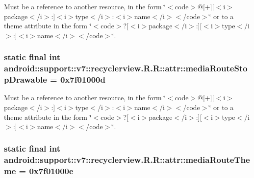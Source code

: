 Must be a reference to another resource, in the form \char`\"{}$<$code$>$@\mbox{[}+\mbox{]}\mbox{[}$<$i$>$package$<$/i$>$:\mbox{]}$<$i$>$type$<$/i$>$:$<$i$>$name$<$/i$>$$<$/code$>$\char`\"{} or to a theme attribute in the form \char`\"{}$<$code$>$?\mbox{[}$<$i$>$package$<$/i$>$:\mbox{]}\mbox{[}$<$i$>$type$<$/i$>$:\mbox{]}$<$i$>$name$<$/i$>$$<$/code$>$\char`\"{}. \hypertarget{classandroid_1_1support_1_1v7_1_1recyclerview_1_1_r_1_1attr_12855dc9e5bca1aa3cdfa21012c27acc}{
\subsubsection[{mediaRouteStopDrawable}]{\setlength{\rightskip}{0pt plus 5cm}static final int android::support::v7::recyclerview.R.R::attr::mediaRouteStopDrawable = 0x7f01000d}}
\label{classandroid_1_1support_1_1v7_1_1recyclerview_1_1_r_1_1attr_12855dc9e5bca1aa3cdfa21012c27acc}


Must be a reference to another resource, in the form \char`\"{}$<$code$>$@\mbox{[}+\mbox{]}\mbox{[}$<$i$>$package$<$/i$>$:\mbox{]}$<$i$>$type$<$/i$>$:$<$i$>$name$<$/i$>$$<$/code$>$\char`\"{} or to a theme attribute in the form \char`\"{}$<$code$>$?\mbox{[}$<$i$>$package$<$/i$>$:\mbox{]}\mbox{[}$<$i$>$type$<$/i$>$:\mbox{]}$<$i$>$name$<$/i$>$$<$/code$>$\char`\"{}. \hypertarget{classandroid_1_1support_1_1v7_1_1recyclerview_1_1_r_1_1attr_e516f2a0b7a437e77a4d8f51ffbb2af5}{
\subsubsection[{mediaRouteTheme}]{\setlength{\rightskip}{0pt plus 5cm}static final int android::support::v7::recyclerview.R.R::attr::mediaRouteTheme = 0x7f01000e}}
\label{classandroid_1_1support_1_1v7_1_1recyclerview_1_1_r_1_1attr_e516f2a0b7a437e77a4d8f51ffbb2af5}


